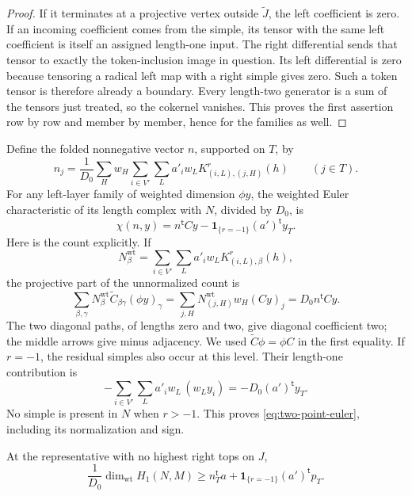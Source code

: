 \begin{proof}
If it terminates at a projective vertex outside \(\widetilde J\),
the left coefficient is zero.  If an incoming coefficient comes
from the simple, its tensor with the same left coefficient is
itself an assigned length-one input.  The right differential sends
that tensor to exactly the token-inclusion image in question.  Its
left differential is zero because tensoring a radical left map
with a right simple gives zero.  Such a token tensor is therefore
already a boundary.  Every length-two generator is a sum of the
tensors just treated, so the cokernel vanishes.  This proves the
first assertion row by row and member by member, hence for the
families as well.
\end{proof}

Define the folded nonnegative vector \(n\), supported on \(T\), by
\begin{equation}
\label{eq:two-point-right-weight}
 n_j=\frac1{D_0}\sum_H w_H
       \sum_{i\in V'}\sum_L a'_i w_L
                K^r_{(i,L),(j,H)}(h)
       \qquad(j\in T).
\end{equation}
For any left-layer family of weighted dimension \(\phi y\), the
weighted Euler characteristic of its length complex with \(N\),
divided by \(D_0\), is
\begin{equation}
\label{eq:two-point-euler}
 \chi(n,y)=n^{\mathsf t}Cy
       -\mathbf1_{\{r=-1\}}(a')^{\mathsf t}y_T.
\end{equation}
Here is the count explicitly.  If
\[
 N_\beta^{\mathrm{wt}}
      =\sum_{i\in V'}\sum_L a'_i w_L K^r_{(i,L),\beta}(h),
\]
the projective part of the unnormalized count is
\[
 \sum_{\beta,\gamma}
       N_\beta^{\mathrm{wt}}\widetilde C_{\beta\gamma}(\phi y)_\gamma
   =\sum_{j,H}N_{(j,H)}^{\mathrm{wt}}w_H(Cy)_j
   =D_0 n^{\mathsf t}Cy.
\]
The two diagonal paths, of lengths zero and two, give diagonal
coefficient two; the middle arrows give minus adjacency.  We used
\(\widetilde C\phi=\phi C\) in the first equality.  If \(r=-1\),
the residual simples also occur at this level.  Their length-one
contribution is
\[
 -\sum_{i\in V'}\sum_L a'_i w_L\,(w_Ly_i)
      =-D_0(a')^{\mathsf t}y_T.
\]
No simple is present in \(N\) when \(r>-1\).  This proves
\eqref{eq:two-point-euler}, including its normalization and sign.

\begin{lemma}
\label{lem:two-point-euler-estimate}
At the representative with no highest right tops on \(J\),
\begin{equation}
\label{eq:two-point-estimate}
 \frac1{D_0}\dim_{\mathrm{wt}}H_1(N,M)
       \ge n_T^{\mathsf t}a
              +\mathbf1_{\{r=-1\}}(a')^{\mathsf t}p_T.
\end{equation}
\end{lemma}

